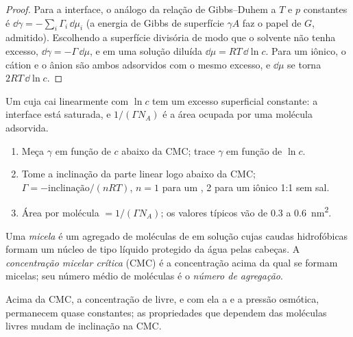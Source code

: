 \begin{proof}
Para a interface, o análogo da relação de Gibbs--Duhem a $T$ e $p$ constantes é
$\dd\gamma = -\sum_i\Gamma_i\,\dd\mu_i$ (a energia de Gibbs de superfície $\gamma A$ faz o papel de $G$,
admitido). Escolhendo a superfície divisória de modo que o solvente não tenha
excesso, $\dd\gamma = -\Gamma\,\dd\mu$, e em uma solução diluída $\dd\mu = RT\,\dd\ln c$. Para um 
iônico, o cátion e o ânion são ambos adsorvidos com o mesmo excesso, e $\dd\mu$ se torna
$2RT\,\dd\ln c$.
\end{proof}

Um  cuja  cai linearmente com $\ln c$ tem um excesso
superficial constante: a interface está saturada, e $1/(\Gamma N_A)$ é a área ocupada
por uma molécula adsorvida.

\begin{method}\label{met:b3:colloids:surface-excess}
\begin{enumerate}
  \item Meça $\gamma$ em função de $c$ abaixo da CMC; trace $\gamma$ em função de $\ln c$.
  \item Tome a inclinação da parte linear logo abaixo da CMC; $\Gamma = -\text{inclinação}/(nRT)$, $n
        = 1$ para um , 2 para um iônico 1:1 sem sal.
  \item Área por molécula $= 1/(\Gamma N_A)$; os valores típicos vão de 0.3 a \qty{0.6}{nm^2}.
\end{enumerate}
\end{method}

\begin{definition}\label{def:b3:colloids:micelle}
Uma \emph{micela} é um agregado de moléculas de  em solução
cujas caudas hidrofóbicas formam um núcleo de tipo líquido protegido da água
pelas cabeças. A \emph{concentração micelar crítica}
(CMC) é a concentração acima da qual se formam micelas; seu número médio de
moléculas é o \emph{número de agregação}.
\end{definition}

\begin{proposition}\label{prop:b3:colloids:cmc-break}
Acima da CMC, a concentração de  livre, e com ela a  e
a pressão osmótica, permanecem quase constantes; as propriedades que dependem das
moléculas livres mudam de inclinação na CMC.
\end{proposition}

